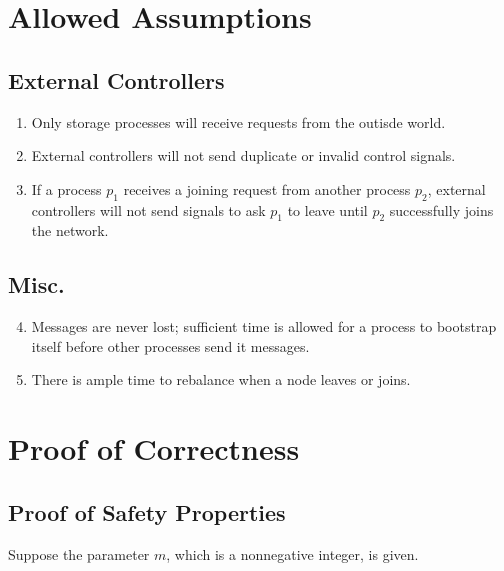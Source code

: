 \documentclass[11pt]{article}
\begin{document}
\section{Allowed Assumptions}

\subsection{External Controllers}
\begin{enumerate}[\text{A}1]
\item \label{A:finite_time_eating} Only storage processes will receive requests from the outisde world.

\item \label{A:no_invalid_signals} External controllers will not send duplicate or invalid control signals.

\item \label{A:E_guarantees_nodes_entering_network} If a process $p_1$ receives a joining request from another process $p_2$, external controllers will not send signals to ask $p_1$ to leave until $p_2$ successfully joins the network.
\end{enumerate}

\subsection{Misc.}
\begin{enumerate}[\text{A}1]
\setcounter{enumi}{3}
\item \label{A:message_never_lost} Messages are never lost; sufficient time is allowed for a process to bootstrap itself before other processes send it messages.
\item There is ample time to rebalance when a node leaves or joins.
\end{enumerate}


\section{Proof of Correctness}


\subsection{Proof of Safety Properties}
Suppose the parameter $m$, which is a nonnegative integer, is given.
\end{document}
